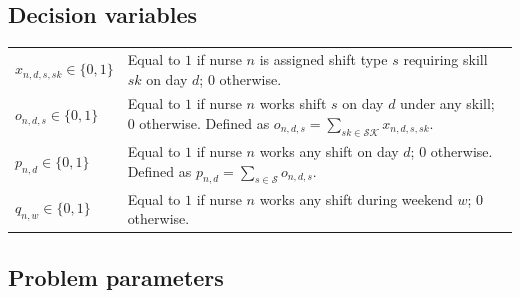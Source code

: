 \documentclass[11pt]{article}
\begin{document}
\subsection*{Decision variables}

\begin{tabular}{@{}lp{10cm}@{}}
  $x_{n,d,s,sk} \in \{0,1\}$ &
    Equal to $1$ if nurse $n$ is assigned shift type $s$ requiring
    skill $sk$ on day $d$; $0$ otherwise. \\[6pt]

  $o_{n,d,s} \in \{0,1\}$ &
    Equal to $1$ if nurse $n$ works shift $s$ on day $d$ under any
    skill; $0$ otherwise. Defined as
    $o_{n,d,s} = \sum_{sk \in \mathcal{SK}} x_{n,d,s,sk}$. \\[6pt]

  $p_{n,d} \in \{0,1\}$ &
    Equal to $1$ if nurse $n$ works any shift on day $d$; $0$
    otherwise. Defined as $p_{n,d} = \sum_{s \in \mathcal{S}}
    o_{n,d,s}$. \\[6pt]

  $q_{n,w} \in \{0,1\}$ &
    Equal to $1$ if nurse $n$ works any shift during weekend $w$;
    $0$ otherwise. \\
\end{tabular}

\subsection*{Problem parameters}
\end{document}
